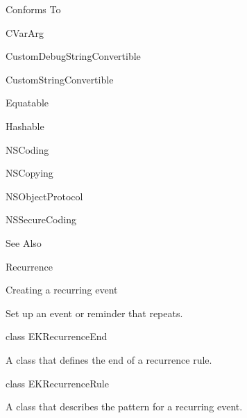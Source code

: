 \documentclass{article}
\begin{document}
Conforms To

CVarArg

CustomDebugStringConvertible

CustomStringConvertible

Equatable

Hashable

NSCoding

NSCopying

NSObjectProtocol

NSSecureCoding

See Also

Recurrence

Creating a recurring event

Set up an event or reminder that repeats.

class EKRecurrenceEnd

A class that defines the end of a recurrence rule.

class EKRecurrenceRule

A class that describes the pattern for a recurring event.

\newpage
\end{document}
